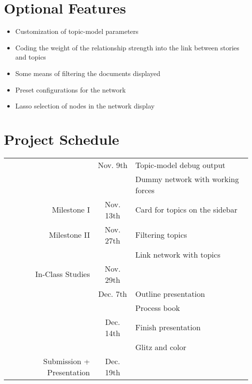 \section{Optional Features}
\begin{itemize}
	\item Customization of topic-model parameters
	\item Coding the weight of the relationship strength into the link
		between stories and topics
	\item Some means of filtering the documents displayed
	\item Preset configurations for the network
	\item Lasso selection of nodes in the network display
\end{itemize}

\section{Project Schedule}

\begin{tabular}{|r|c|l|}
	\hline
	                          &  Nov. 9th & Topic-model debug output \\
														&           & Dummy network with working forces\\\hline
	              Milestone I & Nov. 13th & Card for topics on the sidebar \\\hline
							 Milestone II & Nov. 27th & Filtering topics \\
														&           & Link network with topics \\\hline
					 In-Class Studies & Nov. 29th & \\\hline
	                          &  Dec. 7th & Outline presentation \\
														&           & Process book \\\hline
	                          & Dec. 14th & Finish presentation \\
														&           & Glitz and color \\\hline
	Submission + Presentation & Dec. 19th & \\\hline
\end{tabular}


